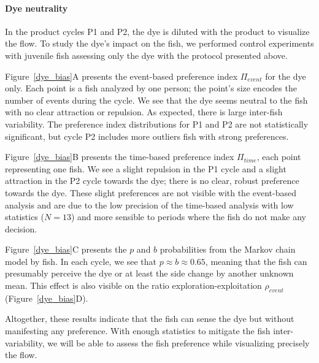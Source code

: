   \paragraph{Dye neutrality} In the product cycles P1 and P2, the dye is diluted with the product to visualize the flow. To study the dye's impact on the fish, we performed control experiments with juvenile fish assessing only the dye with the protocol presented above.

  Figure~\ref{dye_bias}A presents the event-based preference index $\Pi_{event}$ for the dye only. Each point is a fish analyzed by one person; the point's size encodes the number of events during the cycle. We see that the dye seems neutral to the fish with no clear attraction or repulsion. As expected, there is large inter-fish variability. The preference index distributions for P1 and P2 are not statistically significant, but cycle P2 includes more outliers fish with strong preferences.

  Figure~\ref{dye_bias}B presents the time-based preference index $\Pi_{time}$, each point representing one fish. We see a slight repulsion in the P1 cycle and a slight attraction in the P2 cycle towards the dye; there is no clear, robust preference towards the dye. These slight preferences are not visible with the event-based analysis and are due to the low precision of the time-based analysis with low statistics ($N=13$) and more sensible to periods where the fish do not make any decision.

  Figure~\ref{dye_bias}C presents the $p$ and $b$ probabilities from the Markov chain model by fish. In each cycle, we see that $p \approx b \approx 0.65$, meaning that the fish can presumably perceive the dye or at least the side change by another unknown mean. This effect is also visible on the ratio exploration-exploitation $\rho_{event}$ (Figure~\ref{dye_bias}D).

  Altogether, these results indicate that the fish can sense the dye but without manifesting any preference. With enough statistics to mitigate the fish inter-variability, we will be able to assess the fish preference while visualizing precisely the flow.

